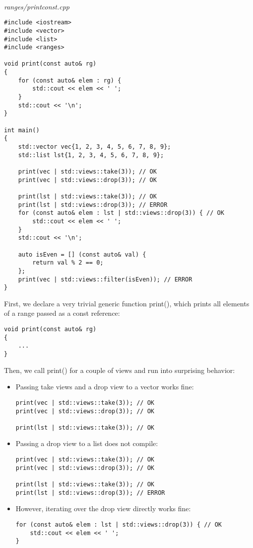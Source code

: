 \noindent
\hspace*{\fill} \\ %
\textit{ranges/printconst.cpp}

\begin{lstlisting}[style=styleCXX]
#include <iostream>
#include <vector>
#include <list>
#include <ranges>

void print(const auto& rg)
{
	for (const auto& elem : rg) {
		std::cout << elem << ' ';
	}
	std::cout << '\n';
}

int main()
{
	std::vector vec{1, 2, 3, 4, 5, 6, 7, 8, 9};
	std::list lst{1, 2, 3, 4, 5, 6, 7, 8, 9};
	
	print(vec | std::views::take(3)); // OK
	print(vec | std::views::drop(3)); // OK
	
	print(lst | std::views::take(3)); // OK
	print(lst | std::views::drop(3)); // ERROR
	for (const auto& elem : lst | std::views::drop(3)) { // OK
		std::cout << elem << ' ';
	}
	std::cout << '\n';
	
	auto isEven = [] (const auto& val) {
		return val % 2 == 0;
	};
	print(vec | std::views::filter(isEven)); // ERROR
}
\end{lstlisting}

First, we declare a very trivial generic function print(), which prints all elements of a range passed as a const reference:

\begin{lstlisting}[style=styleCXX]
void print(const auto& rg)
{
	...
}
\end{lstlisting}

Then, we call print() for a couple of views and run into surprising behavior:


\begin{itemize}
\item
Passing take views and a drop view to a vector works fine:

\begin{lstlisting}[style=styleCXX]
print(vec | std::views::take(3)); // OK
print(vec | std::views::drop(3)); // OK

print(lst | std::views::take(3)); // OK
\end{lstlisting}

\item
Passing a drop view to a list does not compile:

\begin{lstlisting}[style=styleCXX]
print(vec | std::views::take(3)); // OK
print(vec | std::views::drop(3)); // OK

print(lst | std::views::take(3)); // OK
print(lst | std::views::drop(3)); // ERROR
\end{lstlisting}

\item
However, iterating over the drop view directly works fine:

\begin{lstlisting}[style=styleCXX]
for (const auto& elem : lst | std::views::drop(3)) { // OK
	std::cout << elem << ' ';
}
\end{lstlisting}
\end{itemize}

